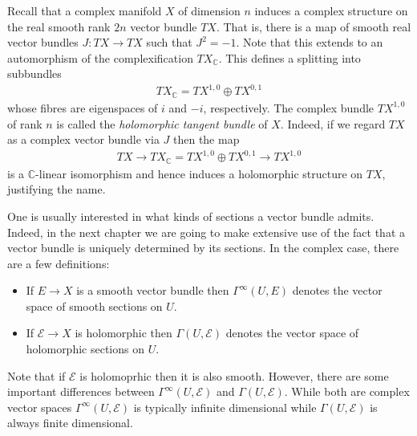\documentclass[12pt]{ociamthesis}  %
\begin{document}
\begin{example}
  Recall that a complex manifold $X$ of dimension $n$ induces a
  complex structure on the real smooth rank $2n$ vector bundle $TX$.
  That is, there is a map of smooth real vector bundles
  $J : TX \to TX$ such that $J^2 = -1$. Note that this extends to
  an automorphism of the complexification $TX_{\mathbb{C}}$.
  This defines a splitting into subbundles
  \begin{align}\label{eq:tangent_decomposition}
    TX_{\mathbb{C}}  = TX^{1,0} \oplus TX^{0,1}
  \end{align}
  whose fibres are eigenspaces of $i$ and $-i$, respectively. The
  complex bundle $TX^{1,0}$ of rank $n$ is called the
  \emph{holomorphic tangent bundle} of $X$. Indeed, if we regard $TX$
  as a complex vector bundle via $J$ then the map
  \begin{align}\label{eq:holomorphic_tangent_bundle}
    TX
    \longrightarrow TX_{\mathbb C}
    = TX^{1,0} \oplus TX^{0,1}
    \longrightarrow TX^{1,0}
  \end{align}
  is a $\mathbb{C}$-linear isomorphism and hence induces a holomorphic
  structure on $TX$, justifying the name.
\end{example}

One is usually interested in what kinds of sections a vector bundle
admits. Indeed, in the next chapter we are going to make extensive use
of the fact that a vector bundle is uniquely determined by its sections.
In the complex case, there are a few definitions:

\begin{definition}
  \begin{itemize}
    \item If $E\to X$ is a smooth vector bundle then $\Gamma^\infty(U,E)$
          denotes the vector space of smooth sections on $U$.
    \item If $\mathcal E\to X$ is holomorphic then $\Gamma(U,\mathcal E)$
          denotes the vector space of holomorphic sections on $U$.
  \end{itemize}
\end{definition}

Note that if $\mathcal E$ is holomoprhic then it is also smooth.
However, there are some important differences between
$\Gamma^\infty(U,\mathcal E)$ and $\Gamma(U,\mathcal E)$. While both are
complex vector spaces $\Gamma^\infty(U,\mathcal E)$ is typically infinite
dimensional while $\Gamma(U,\mathcal E)$ is always finite
dimensional.~\cite[Theorem 1.4.1]{ma2007}
\end{document}
